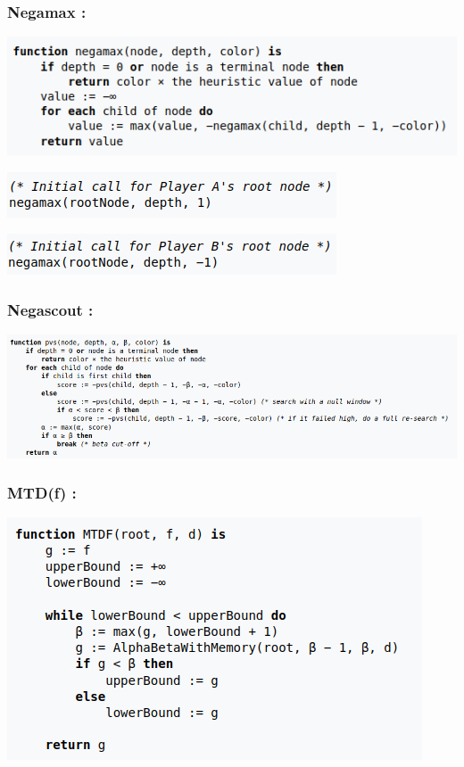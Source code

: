 \documentclass{article}
\begin{document}
\subsubsection{Negamax : }
\centerline{\includegraphics[scale = 0.5]{Negamax_1.png}}
\centerline{\includegraphics[scale = 0.5]{Negamax_2.png}}
\centerline{\includegraphics[scale = 0.5]{Negamax_3.png}}
\medskip
\subsubsection{Negascout : }

\centerline{\includegraphics[scale = 0.5]{Negascout.png}}
\medskip
\subsubsection{MTD(f) : }

\centerline{\includegraphics[scale = 0.5]{MTDf.png}}
\medskip
\end{document}
